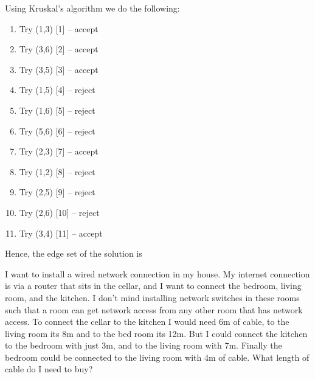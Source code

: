 \solution
Using Kruskal's algorithm we do the following:
\begin{enumerate}
\item Try (1,3) [1] -- accept 
\item Try (3,6) [2] -- accept
\item Try (3,5) [3] -- accept
\item Try (1,5) [4] -- reject
\item Try (1,6) [5] -- reject
\item Try (5,6) [6] -- reject
\item Try (2,3) [7] -- accept
\item Try (1,2) [8] -- reject
\item Try (2,5) [9] -- reject
\item Try (2,6) [10] -- reject
\item Try (3,4) [11] -- accept
\end{enumerate}
Hence, the edge set of the solution is 






 I want to install a wired network connection in my house. My internet connection is via a router that sits in the cellar, and I want to connect the bedroom, living room, and the kitchen. I don't mind installing network switches in these rooms such that a room can get network access from any other room that has network access. To connect the cellar to the kitchen I would need 6m of cable, to the living room its 8m and to the bed room its 12m. But I could connect the kitchen to the bedroom with just 3m, and to the living room with 7m. Finally the bedroom could be connected to the living room with 4m of cable. What length of cable do I need to buy? 


